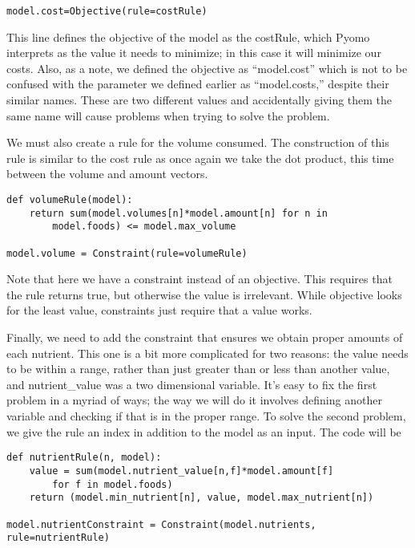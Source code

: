\documentclass{article}
\begin{document}
\begin{verbatim}model.cost=Objective(rule=costRule) \end{verbatim}

This line defines the objective of the model as the costRule,  which Pyomo interprets as the value it needs to minimize; in this case it will minimize our costs.  Also, as a note, we defined the objective as ``model.cost'' which is not to be confused with the parameter we defined earlier as ``model.costs,'' despite their similar names.  These are two different values and accidentally giving them the same name will cause problems when trying to solve the problem.

We must also create a rule for the volume consumed.  The construction of this rule is similar to the cost rule as once again we take the dot product, this time between the volume and amount vectors.

\begin{verbatim}def volumeRule(model):
    return sum(model.volumes[n]*model.amount[n] for n in
        model.foods) <= model.max_volume

model.volume = Constraint(rule=volumeRule)
\end{verbatim}

Note that here we have a constraint instead of an objective.  This requires that the rule returns true, but otherwise the value is irrelevant.  While objective looks for the least value, constraints just require that a value works.

Finally, we need to add the constraint that ensures we obtain proper amounts of each nutrient.  This one is a bit more complicated for two reasons: the value needs to be within a range, rather than just greater than or less than another value, and nutrient\_value was a two dimensional variable.  It's easy to fix the first problem in a myriad of ways; the way we will do it involves defining another variable and checking if that is in the proper range.  To solve the second problem, we give the rule an index in addition to the model as an input.  The code will be

\begin{verbatim}
def nutrientRule(n, model):
    value = sum(model.nutrient_value[n,f]*model.amount[f]
        for f in model.foods)
    return (model.min_nutrient[n], value, model.max_nutrient[n])

model.nutrientConstraint = Constraint(model.nutrients, rule=nutrientRule)
\end{verbatim}
\end{document}
